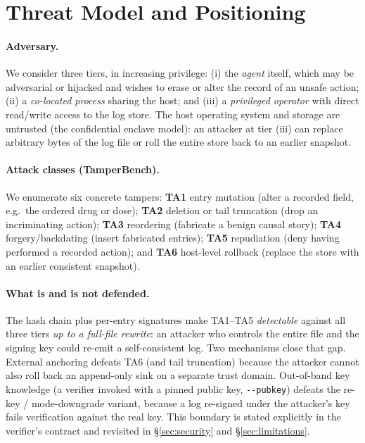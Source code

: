 \documentclass[11pt]{article}
\begin{document}
\section{Threat Model and Positioning}\label{sec:threat}
\paragraph{Adversary.} We consider three tiers, in increasing privilege: (i) the
\emph{agent} itself, which may be adversarial or hijacked and wishes to erase or
alter the record of an unsafe action; (ii) a \emph{co-located process} sharing the
host; and (iii) a \emph{privileged operator} with direct read/write access to the
log store. The host operating system and storage are untrusted (the confidential
enclave model): an attacker at tier (iii) can replace arbitrary bytes of the log
file or roll the entire store back to an earlier snapshot.

\paragraph{Attack classes (TamperBench).} We enumerate six concrete tampers:
\textbf{TA1} entry mutation (alter a recorded field, e.g.\ the ordered drug or
dose); \textbf{TA2} deletion or tail truncation (drop an incriminating action);
\textbf{TA3} reordering (fabricate a benign causal story); \textbf{TA4}
forgery/backdating (insert fabricated entries); \textbf{TA5} repudiation (deny
having performed a recorded action); and \textbf{TA6} host-level rollback (replace
the store with an earlier consistent snapshot).

\paragraph{What is and is not defended.} The hash chain plus per-entry signatures
make TA1--TA5 \emph{detectable} against all three tiers \emph{up to a full-file
rewrite}: an attacker who controls the entire file and the signing key could
re-emit a self-consistent log. Two mechanisms close that gap. External anchoring
defeats TA6 (and tail truncation) because the attacker cannot also roll back an
append-only sink on a separate trust domain. Out-of-band key knowledge (a verifier
invoked with a pinned public key, \texttt{-{}-pubkey}) defeats the re-key /
mode-downgrade variant, because a log re-signed under the attacker's key fails
verification against the real key. This boundary is stated explicitly in the
verifier's contract and revisited in \S\ref{sec:security} and
\S\ref{sec:limitations}.
\end{document}
